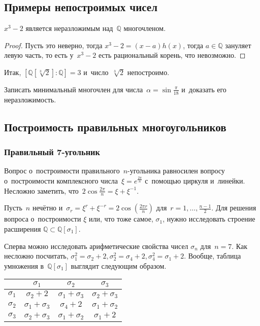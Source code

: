 \documentclass{article}
\begin{document}
\subsection{Примеры непостроимых чисел}

\begin{claim}
  $x^3 - 2$ является неразложимым над~$\mathbb{Q}$ многочленом.
\end{claim}
\begin{proof}
  Пусть это неверно, тогда $x^3 - 2 = (x - a)h(x)$, тогда $a \in \mathbb{Q}$
  зануляет левую часть, то есть у~$x^3 - 2$ есть рациональный корень, что
  невозможно.
\end{proof}

Итак, $[\mathbb{Q}[\sqrt[3]{2}]:\mathbb{Q}] = 3$ и~число~$\sqrt[3]{2}$
непостроимо.

\begin{exercise}
  Записать минимальный многочлен для числа~$\alpha = \sin\frac{\pi}{18}$
  и~доказать его неразложимость.
\end{exercise}

\subsection{Построимость правильных многоугольников}
\subsubsection{Правильный 7-угольник}

Вопрос о~построимости правильного~$n$-угольника равносилен вопросу
о~построимости комплексного числа~$\xi = e^{\frac{2\pi}{n}}$ с~помощью циркуля
и~линейки. Несложно заметить, что~$2\cos\frac{2\pi}{n} = \xi + \xi^{-1}$.

Пусть~$n$ нечётно и~$\sigma_r = \xi^r + \xi^{-r} = 2\cos(\frac{2\pi r}{n})$
для~$r=1,\ldots,\frac{n-1}{2}$. Для решения вопроса о~построимости $\xi$ или,
что тоже самое, $\sigma_1$, нужно исследовать строение расширения $\mathbb{Q}
\subset \mathbb{Q}[\sigma_1]$.

Сперва можно исследовать арифметические свойства чисел $\sigma_n$ для~$n = 7$.
Как несложно посчитать, $\sigma_1^2 = \sigma_2 + 2, \sigma_2^2 = \sigma_4 + 2,
\sigma_4^2 = \sigma_1 + 2$. Вообще, таблица умножения в~$\mathbb{Q}[\sigma_1]$
выглядит следующим образом.

\begin{center}
  \begin{tabular}{c | c | c | c |}
    \centering
    & $\sigma_1$ & $\sigma_2$ & $\sigma_3$\\
    \hline
    $\sigma_1$ & $\sigma_2 + 2$ & $\sigma_1 + \sigma_3$ & $\sigma_2 +
    \sigma_3$\\
    \hline
    $\sigma_2$ & $\sigma_1 + \sigma_3$ & $\sigma_4 + 2$ & $\sigma_1 +
    \sigma_2$\\
    \hline
    $\sigma_3$ & $\sigma_2 + \sigma_3$ & $\sigma_1 + \sigma_2$ & $\sigma_1 +
    2$\\
    \hline
  \end{tabular}
\end{center}
\end{document}
